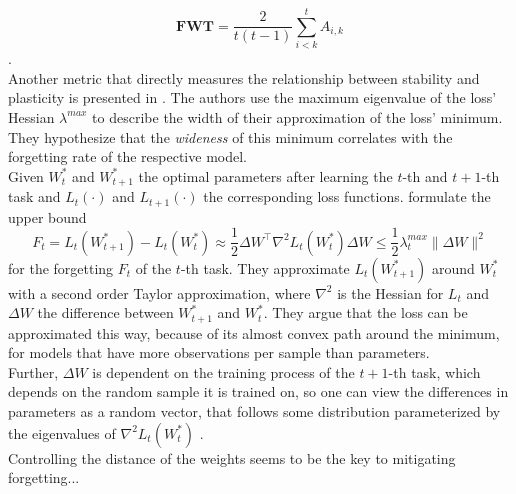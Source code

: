 \begin{equation}
	\mathbf{FWT} = \frac{2}{t(t-1)}\sum_{i < k }^{t} A_{i,k}
\end{equation}
\cite{díazrodríguez2018dontforgetforgettingnew}.\\
Another metric that directly measures the relationship between stability and plasticity is presented in \cite{mirzadeh2020understandingroletrainingregimes}. The authors use the maximum eigenvalue of the loss' Hessian $\lambda^{max}$ to describe the width of their approximation of the loss' minimum. They hypothesize that the \textit{wideness} of this minimum correlates with the forgetting rate of the respective model.\\
Given $W_t^*$ and $W_{t+1}^*$ the optimal parameters after learning the $t$-th and $t+1$-th task and $L_t(\cdot)$ and $L_{t+1}(\cdot)$ the corresponding loss functions. \citeauthor{mirzadeh2020understandingroletrainingregimes} formulate the upper bound
\begin{equation}
	F_t = L_t(W_{t+1}^*) - L_t(W_t^*) \approx \frac{1}{2}{\Delta W}^\top \nabla^2 L_t(W_t^*) \Delta W \leq \frac{1}{2}\lambda_t^{max}\lVert \Delta W \rVert^2
\end{equation}
for the forgetting $F_t$ of the $t$-th task. They approximate $L_t(W_{t+1}^*)$ around $W_t^*$ with a second order Taylor approximation, where $\nabla^2$ is the Hessian for $L_t$ and $\Delta W$ the difference between $W_{t+1}^*$ and $W_t^*$. They argue that the loss can be approximated this way, because of its almost convex path around the minimum, for models that have more observations per sample than parameters.\\
Further, ${\Delta W}$ is dependent on the training process of the $t+1$-th task, which depends on the random sample it is trained on, so one can view the differences in parameters as a random vector, that follows some distribution parameterized by the eigenvalues of $\nabla^2 L_t(W_t^*)$ \cite{mirzadeh2020understandingroletrainingregimes}.\\

Controlling the distance of the weights seems to be the key to mitigating forgetting...